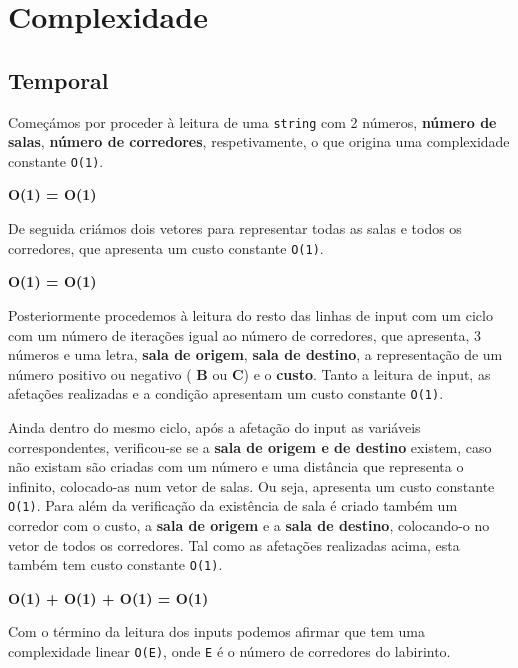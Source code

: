 \documentclass[11pt]{article}
\begin{document}
\section{Complexidade}
\subsection{Temporal}

\hspace{0,5cm}Começámos por proceder à leitura de uma \verb|string| com 2 números, \textbf{número
de salas}, \textbf{número de corredores}, respetivamente, o que origina uma complexidade constante
\verb|O(1)|.

\begin{center}
    \textbf{O(1) = O(1)}
\end{center}

De seguida criámos dois vetores para representar todas as salas e todos os corredores, que apresenta
um custo constante \verb|O(1)|.

\begin{center}
    \textbf{O(1) = O(1)}
\end{center}

Posteriormente procedemos à leitura do resto das linhas de input com um ciclo com um número
de iterações igual ao número de corredores, que apresenta, 3 números e uma letra, \textbf{sala
de origem}, \textbf{sala de destino}, a representação de um número positivo ou negativo (
\textbf{B} ou \textbf{C}) e o \textbf{custo}. Tanto a leitura de input, as afetações realizadas
e a condição apresentam um custo constante \verb|O(1)|.

Ainda dentro do mesmo ciclo, após a afetação do input as variáveis correspondentes, verificou-se
se a \textbf{sala de origem e de destino} existem, caso não existam são criadas com um número e
uma distância que representa o infinito, colocado-as num vetor de salas. Ou seja, apresenta um
custo constante \verb|O(1)|. Para além da verificação da existência de sala é criado também um
corredor com o custo, a \textbf{sala de origem} e a \textbf{sala de destino}, colocando-o no 
vetor de todos os corredores. Tal como as afetações realizadas acima, esta também tem custo
constante \verb|O(1)|.

\begin{center}
    \textbf{O(1) + O(1) + O(1) = O(1)}
\end{center}

Com o término da leitura dos inputs podemos afirmar que tem uma complexidade linear \verb|O(E)|,
onde \verb|E| é o número de corredores do labirinto.
\end{document}
